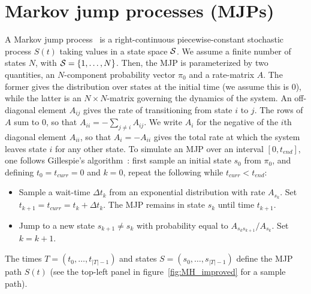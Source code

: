 \section{Markov jump processes (MJPs)} 
A Markov jump process~\citep{Cinlar1975} is a right-continuous piecewise-constant stochastic process $S(t)$ taking values in a state space ${\mathcal S}$. %
We assume a finite number of states $N$, with ${\mathcal S} = \{1,\ldots,N\}$. 
Then, the MJP is parameterized by two quantities, an $N$-component probability vector $\pi_0$ and a rate-matrix $A$. 
The former gives the distribution over states at the initial time (we assume this is $0$), while the latter is an $N \times N$-matrix governing the dynamics of the system.  
An off-diagonal element $A_{ij}$ gives the rate of transitioning from state $i$ to $j$. 
The rows of $A$ sum to $0$, so that $A_{ii}=-\sum_{j \neq i} A_{ij}  $. 
We write $A_i$ for the negative of the $i$th diagonal element $A_{ii}$, so that $A_i = -A_{ii}$ gives the total rate at which the system leaves state $i$ for any other state.
To simulate an MJP over an interval $[0,t_{end}]$, one follows Gillespie's algorithm~\citep{gillespie97}: 
first sample an initial state $s_0$ from $\pi_0$, and defining $t_0 = t_{curr} = 0$ and $k = 0$, repeat the following while $t_{curr} < t_{end}$:
\begin{itemize}
  \item Sample a wait-time $\Delta t_k$ from an exponential distribution with rate $A_{s_k}$.  
    Set $t_{k+1} = t_{curr} = t_{k} + \Delta t_k$. 
    The MJP remains in state $s_k$ until time $t_{k+1}$.
  \item Jump to a new state $s_{k+1} \neq s_k$ with probability equal to $A_{s_ks_{k+1}}/A_{s_k}$. Set $k=k+1$.
\end{itemize}
The times $T=(t_0, \dotsc, t_{|T| - 1})$ and states $S=(s_0, \dotsc, s_{|T| - 1 })$ define the MJP path $S(t)$ (see the top-left panel in figure~\ref{fig:MH_improved} for a sample path).

